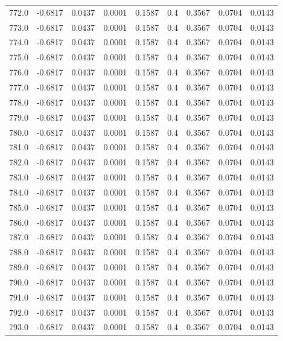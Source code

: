 \begin{longtable}{lrrrrrrrr}
772.0 & -0.6817 & 0.0437 & 0.0001 & 0.1587 & 0.4 & 0.3567 & 0.0704 & 0.0143 \\
773.0 & -0.6817 & 0.0437 & 0.0001 & 0.1587 & 0.4 & 0.3567 & 0.0704 & 0.0143 \\
774.0 & -0.6817 & 0.0437 & 0.0001 & 0.1587 & 0.4 & 0.3567 & 0.0704 & 0.0143 \\
775.0 & -0.6817 & 0.0437 & 0.0001 & 0.1587 & 0.4 & 0.3567 & 0.0704 & 0.0143 \\
776.0 & -0.6817 & 0.0437 & 0.0001 & 0.1587 & 0.4 & 0.3567 & 0.0704 & 0.0143 \\
777.0 & -0.6817 & 0.0437 & 0.0001 & 0.1587 & 0.4 & 0.3567 & 0.0704 & 0.0143 \\
778.0 & -0.6817 & 0.0437 & 0.0001 & 0.1587 & 0.4 & 0.3567 & 0.0704 & 0.0143 \\
779.0 & -0.6817 & 0.0437 & 0.0001 & 0.1587 & 0.4 & 0.3567 & 0.0704 & 0.0143 \\
780.0 & -0.6817 & 0.0437 & 0.0001 & 0.1587 & 0.4 & 0.3567 & 0.0704 & 0.0143 \\
781.0 & -0.6817 & 0.0437 & 0.0001 & 0.1587 & 0.4 & 0.3567 & 0.0704 & 0.0143 \\
782.0 & -0.6817 & 0.0437 & 0.0001 & 0.1587 & 0.4 & 0.3567 & 0.0704 & 0.0143 \\
783.0 & -0.6817 & 0.0437 & 0.0001 & 0.1587 & 0.4 & 0.3567 & 0.0704 & 0.0143 \\
784.0 & -0.6817 & 0.0437 & 0.0001 & 0.1587 & 0.4 & 0.3567 & 0.0704 & 0.0143 \\
785.0 & -0.6817 & 0.0437 & 0.0001 & 0.1587 & 0.4 & 0.3567 & 0.0704 & 0.0143 \\
786.0 & -0.6817 & 0.0437 & 0.0001 & 0.1587 & 0.4 & 0.3567 & 0.0704 & 0.0143 \\
787.0 & -0.6817 & 0.0437 & 0.0001 & 0.1587 & 0.4 & 0.3567 & 0.0704 & 0.0143 \\
788.0 & -0.6817 & 0.0437 & 0.0001 & 0.1587 & 0.4 & 0.3567 & 0.0704 & 0.0143 \\
789.0 & -0.6817 & 0.0437 & 0.0001 & 0.1587 & 0.4 & 0.3567 & 0.0704 & 0.0143 \\
790.0 & -0.6817 & 0.0437 & 0.0001 & 0.1587 & 0.4 & 0.3567 & 0.0704 & 0.0143 \\
791.0 & -0.6817 & 0.0437 & 0.0001 & 0.1587 & 0.4 & 0.3567 & 0.0704 & 0.0143 \\
792.0 & -0.6817 & 0.0437 & 0.0001 & 0.1587 & 0.4 & 0.3567 & 0.0704 & 0.0143 \\
793.0 & -0.6817 & 0.0437 & 0.0001 & 0.1587 & 0.4 & 0.3567 & 0.0704 & 0.0143 \\

\end{longtable}
